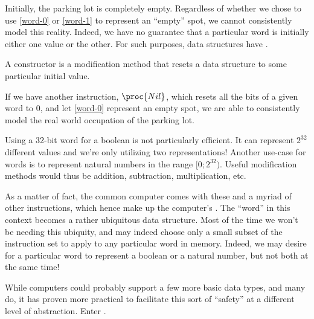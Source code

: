 Initially, the parking lot is completely empty. Regardless of whether we chose
to use \ref{word-0} or \ref{word-1} to represent an ``empty'' spot, we cannot
consistently model this reality. Indeed, we have no guarantee that a particular
word is initially either one value or the other. For such purposes, data
structures have .

\begin{definition}

A constructor is a modification method that resets a data structure to some
particular initial value.

\end{definition}

If we have another instruction, $\proc{Nil}$, which resets all the bits of a
given word to $0$, and let \ref{word-0} represent an empty spot, we are able to
consistently model the real world occupation of the parking lot.


Using a 32-bit word for a boolean is not particularly efficient. It can
represent $2^{32}$ different values and we're only utilizing two
representations\footnotemark!  Another use-case for words is to represent
natural numbers in the range $[0;2^{32})$.  Useful modification methods would
thus be addition, subtraction, multiplication, etc.


As a matter of fact, the common computer comes with these and a myriad of other
instructions, which hence make up the computer's . The
``word'' in this context becomes a rather ubiquitous data structure. Most of
the time we won't be needing this ubiquity, and may indeed choose only a small
subset of the instruction set to apply to any particular word in memory.
Indeed, we may desire for a particular word to represent a boolean or a natural
number, but not both at the same time!

While computers could probably support a few more basic data types, and many
do, it has proven more practical to facilitate this sort of ``safety'' at a
different level of abstraction. Enter .

